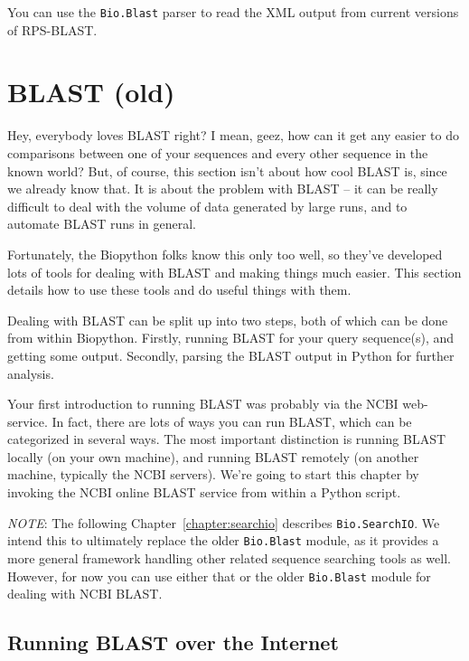You can use the \verb|Bio.Blast| parser to read the XML output from
current versions of RPS-BLAST.

\chapter{BLAST (old)}
\label{chapter:blast_old}
Hey, everybody loves BLAST right? I mean, geez, how can it get any easier to do comparisons between one of your sequences and every other sequence in the known world? But, of course, this section isn't about how cool BLAST is, since we already know that. It is about the problem with BLAST -- it can be really difficult to deal with the volume of data generated by large runs, and to automate BLAST runs in general.

Fortunately, the Biopython folks know this only too well, so they've developed lots of tools for dealing with BLAST and making things much easier. This section details how to use these tools and do useful things with them.

Dealing with BLAST can be split up into two steps, both of which can be done from within Biopython.
Firstly, running BLAST for your query sequence(s), and getting some output.
Secondly, parsing the BLAST output in Python for further analysis.

Your first introduction to running BLAST was probably via the NCBI web-service.
In fact, there are lots of ways you can run BLAST, which can be categorized in several ways.
The most important distinction is running BLAST locally (on your own machine),
and running BLAST remotely (on another machine, typically the NCBI servers).
We're going to start this chapter by invoking the NCBI online BLAST service
from within a Python script.

\emph{NOTE}: The following Chapter~\ref{chapter:searchio} describes
\verb|Bio.SearchIO|. We intend this to ultimately replace the older
\verb|Bio.Blast| module, as it provides a more general framework handling
other related sequence searching tools as well. However, for now you can use
either that or the older \verb|Bio.Blast| module for dealing with NCBI BLAST.

\section{Running BLAST over the Internet}

